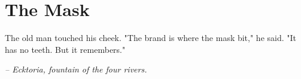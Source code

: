 \chapter*{The Mask}

The old man touched his cheek. "The brand is where the mask bit," he said. "It has no teeth. But it remembers."

\smallskip

\noindent \textit{-- Ecktoria, fountain of the four rivers.}

